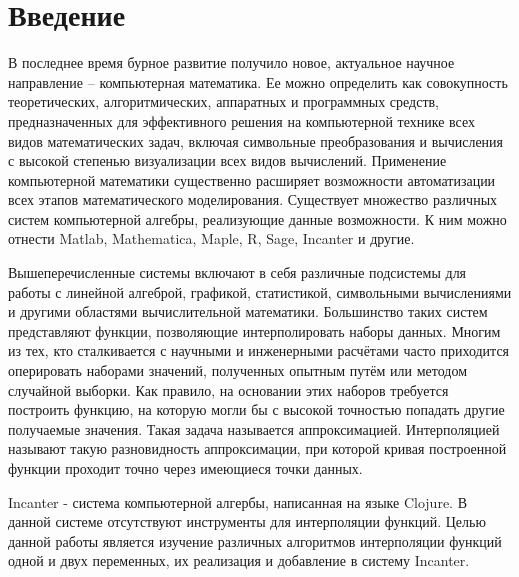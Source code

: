 \section{Введение}

В последнее время бурное развитие получило новое, актуальное научное направление – компьютерная математика. Ее можно определить как совокупность теоретических, алгоритмических, аппаратных и программных средств, предназначенных для эффективного решения на компьютерной технике всех видов математических задач, включая символьные преобразования и вычисления с высокой степенью визуализации всех видов вычислений. Применение компьютерной математики существенно расширяет возможности автоматизации всех этапов математического моделирования. Существует множество различных систем компьютерной алгебры, реализующие данные возможности. К ним можно отнести Matlab, Mathematica, Maple, R, Sage, Incanter и другие.

Вышеперечисленные системы включают в себя различные подсистемы для работы с линейной алгеброй, графикой, статистикой, символьными вычислениями и другими областями вычислительной математики. Большинство таких систем представляют функции, позволяющие интерполировать наборы данных. Многим из тех, кто сталкивается с научными и инженерными расчётами часто приходится оперировать наборами значений, полученных опытным путём или методом случайной выборки. Как правило, на основании этих наборов требуется построить функцию, на которую могли бы с высокой точностью попадать другие получаемые значения. Такая задача называется аппроксимацией. Интерполяцией называют такую разновидность аппроксимации, при которой кривая построенной функции проходит точно через имеющиеся точки данных.

Incanter - система компьютерной алгербы, написанная на языке Clojure. В данной системе отсутствуют инструменты для интерполяции функций. Целью данной работы является изучение различных алгоритмов интерполяции функций одной и двух переменных, их реализация и добавление в систему Incanter.

